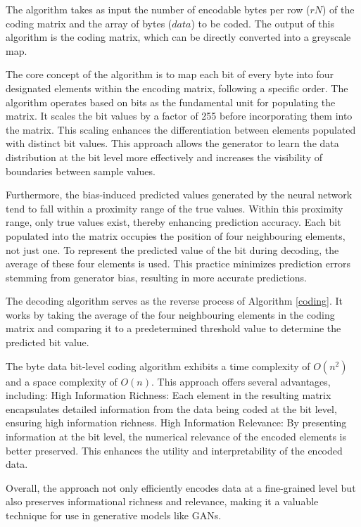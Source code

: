 \documentclass[journal]{IEEEtai}
\begin{document}
The algorithm takes as input the number of encodable bytes per row ($rN$) of the coding matrix and the array of bytes ($data$) to be coded. 
The output of this algorithm is the coding matrix, which can be directly converted into a greyscale map.

The core concept of the algorithm is to map each bit of every byte into four designated elements within the encoding matrix, following a specific order. 
The algorithm operates based on bits as the fundamental unit for populating the matrix.
It scales the bit values by a factor of 255 before incorporating them into the matrix. This scaling enhances the differentiation between elements populated with distinct bit values. 
This approach allows the generator to learn the data distribution at the bit level more effectively and increases the visibility of boundaries between sample values.

Furthermore, the bias-induced predicted values generated by the neural network tend to fall within a proximity range of the true values. 
Within this proximity range, only true values exist, thereby enhancing prediction accuracy. 
Each bit populated into the matrix occupies the position of four neighbouring elements, not just one.
To represent the predicted value of the bit during decoding, the average of these four elements is used.
This practice minimizes prediction errors stemming from generator bias, resulting in more accurate predictions.




The decoding algorithm serves as the reverse process of Algorithm \ref{coding}. 
It works by taking the average of the four neighbouring elements in the coding matrix and comparing it to a predetermined threshold value to determine the predicted bit value.

The byte data bit-level coding algorithm exhibits a time complexity of $O(n^2)$ and a space complexity of $O(n)$. 
This approach offers several advantages, including:
High Information Richness: 
Each element in the resulting matrix encapsulates detailed information from the data being coded at the bit level, ensuring high information richness.
High Information Relevance: 
By presenting information at the bit level, the numerical relevance of the encoded elements is better preserved. This enhances the utility and interpretability of the encoded data.

Overall, the approach not only efficiently encodes data at a fine-grained level but also preserves informational richness and relevance, making it a valuable technique for use in generative models like GANs.
\end{document}
